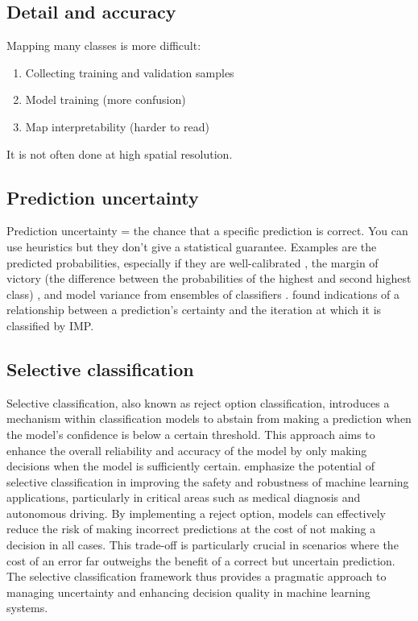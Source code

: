     \subsection{Detail and accuracy}
        
        Mapping many classes is more difficult:
        \begin{enumerate}
        \item Collecting training and validation samples
        \item Model training (more confusion)
        \item Map interpretability (harder to read)
        \end{enumerate}
        It is not often done at high spatial resolution.

    \subsection{Prediction uncertainty}
        Prediction uncertainty = the chance that a specific prediction is correct.
        You can use heuristics but they don't give a statistical guarantee. Examples are the predicted probabilities, especially if they are well-calibrated \citep{niculescu2005predicting}, the margin of victory (the difference between the probabilities of the highest and second highest class) \citep{calderon2021high}, and model variance from ensembles of classifiers \citep{witjes2022spatiotemporal}. \citet{witjes2024iterative} found indications of a relationship between a prediction's certainty and the iteration at which it is classified by IMP.

    \subsection{Selective classification}
        Selective classification, also known as reject option classification, introduces a mechanism within classification models to abstain from making a prediction when the model's confidence is below a certain threshold. This approach aims to enhance the overall reliability and accuracy of the model by only making decisions when the model is sufficiently certain. \citet{geifman2017selective} emphasize the potential of selective classification in improving the safety and robustness of machine learning applications, particularly in critical areas such as medical diagnosis and autonomous driving. By implementing a reject option, models can effectively reduce the risk of making incorrect predictions at the cost of not making a decision in all cases. This trade-off is particularly crucial in scenarios where the cost of an error far outweighs the benefit of a correct but uncertain prediction. The selective classification framework thus provides a pragmatic approach to managing uncertainty and enhancing decision quality in machine learning systems.

